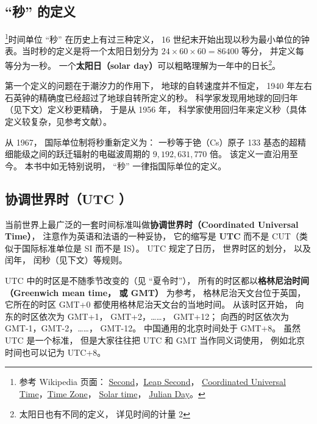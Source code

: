 
\begin{issues}
\end{issues}

\subsection{“秒” 的定义}
\footnote{参考 Wikipedia 页面： \href{https://en.wikipedia.org/wiki/Second}{Second}，\href{https://en.wikipedia.org/wiki/Leap_second}{Leap Second}， \href{https://en.wikipedia.org/wiki/Coordinated_Universal_Time}{Coordinated Universal Time}，\href{https://en.wikipedia.org/wiki/Time_zone}{Time Zone}， \href{https://en.wikipedia.org/wiki/Solar_time}{Solar time}， \href{https://en.wikipedia.org/wiki/Julian_day}{Julian Day}。}时间单位 “秒” 在历史上有过三种定义， 16 世纪末开始出现以秒为最小单位的钟表。当时秒的定义是将一个太阳日划分为 $24\times60\times60 = 86400$ 等分， 并定义每等分为一秒。 一个\textbf{太阳日（solar day）}可以粗略理解为一年中的日长\footnote{太阳日也有不同的定义， 详见时间的计量 2}。

第一个定义的问题在于潮汐力的作用下， 地球的自转速度并不恒定， 1940 年左右石英钟的精确度已经超过了地球自转所定义的秒。 科学家发现用地球的回归年（见下文）定义秒更精确， 于是从 1956 年， 科学家使用回归年来定义秒（具体定义较复杂，见参考文献）。

从 1967， 国际单位制将秒重新定义为： 一秒等于铯（Cs）原子 133 基态的超精细能级之间的跃迁辐射的电磁波周期的 $9,192,631,770$ 倍。 该定义一直沿用至今。 本书中如无特别说明， “秒” 一律指国际单位的定义。

\subsection{协调世界时（UTC ）}
当前世界上最广泛的一套时间标准叫做\textbf{协调世界时（Coordinated Universal Time）}， 注意作为英语和法语的一种妥协， 它的缩写是 \textbf{UTC} 而不是 CUT（类似于国际标准单位是 SI 而不是 IS）。 UTC 规定了日历， 世界时区的划分， 以及闰年， 闰秒（见下文）等规则。

UTC 中的时区是不随季节改变的（见 “夏令时”）， 所有的时区都以\textbf{格林尼治时间（Greenwich mean time， 或 GMT）} 为参考， 格林尼治天文台位于英国， 它所在的时区 GMT+0 都使用格林尼治天文台的当地时间。 从该时区开始， 向东的时区依次为 GMT+1， GMT+2，……， GMT+12； 向西的时区依次为 GMT-1，GMT-2，……， GMT-12。 中国通用的北京时间处于 GMT+8。 虽然 UTC 是一个标准， 但是大家往往把 UTC 和 GMT 当作同义词使用， 例如北京时间也可以记为 UTC+8。

